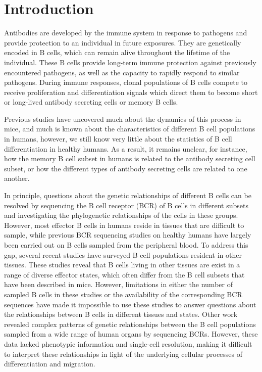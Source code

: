 \section{Introduction}
\noindent Antibodies are developed by the immune system in response to pathogens and  provide protection to an individual in future exposures.  They are genetically encoded in B cells, which can remain alive throughout the lifetime of the individual\cite{slifka1998humoral}. These B cells provide long-term immune protection against previously encountered pathogens, as well as the capacity to rapidly respond to similar pathogens. During immune responses, clonal populations of B cells compete to receive proliferation and differentiation signals which direct them to become short or long-lived antibody secreting cells or memory B cells. 

Previous studies have uncovered much about the dynamics of this process in mice\cite{victora2022germinal},  and much is known about the characteristics of different B cell populations in humans\cite{halliley2015long, glass2020integrated, tarlinton2023making}, however, we still know very little about the statistics of B cell differentiation in healthy humans. As a result, it remains unclear, for instance, how the memory B cell subset in humans is related to the antibody secreting cell subset, or how the different types of antibody secreting cells are related to one another\cite{tarlinton2023making}. 

In principle, questions about the genetic relationships of different B cells can be resolved by sequencing the B cell receptor (BCR) of B cells in different subsets and investigating the phylogenetic relationships of the cells in these groups\cite{ellebedy2016defining,briney2019commonality,phad_lanza_2022clonal, horns2016lineage}. However, most effector B cells in humans reside in tissues that are difficult to sample, while previous BCR sequencing studies on healthy humans have largely been carried out on B cells sampled from the peripheral blood. To address this gap, several recent studies have surveyed B cell populations resident in other tissues\cite{glass2020integrated, tabula2022tabula, dominguez2022cross}.  These studies reveal that B cells living in other tissues are exist in a range of diverse effector states, which often differ from the B cell subsets that have been described in mice\cite{glass2020integrated, dominguez2022cross}. However, limitations in either the number of sampled B cells in these studies or the availability of the corresponding BCR sequences have made it impossible to use these studies to answer questions about the relationships between B cells in different tissues and states. Other work\cite{meng2017atlas, yang2021shared} revealed complex patterns of genetic relationships between the B cell populations sampled from a wide range of human organs by sequencing BCRs. However, these data lacked phenotypic information and single-cell resolution, making it difficult to interpret these relationships in light of the underlying cellular processes of differentiation and migration. 

